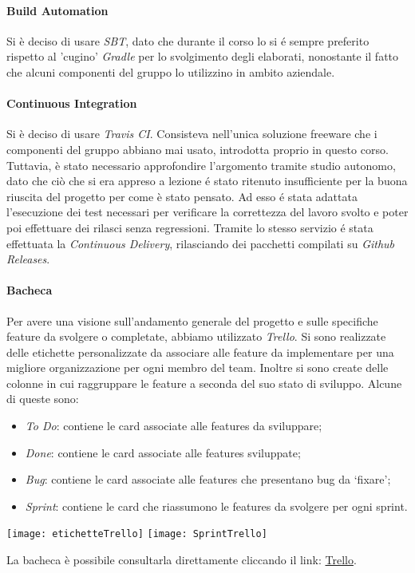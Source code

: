 \paragraph{Build Automation}
Si è deciso di usare \textit{SBT}, dato che durante il corso lo si é sempre preferito rispetto al 'cugino' \textit{Gradle} per lo svolgimento degli elaborati, nonostante il fatto che alcuni componenti del gruppo lo utilizzino in ambito aziendale.

\paragraph{Continuous Integration}
Si è deciso di usare \textit{Travis CI}.
Consisteva nell'unica soluzione freeware che i componenti del gruppo abbiano mai usato, introdotta proprio in questo corso.
Tuttavia, è stato necessario approfondire l'argomento tramite studio autonomo, dato che ciò che si era appreso a lezione é stato ritenuto insufficiente per la buona riuscita del progetto per come è stato pensato.
Ad esso é stata adattata l'esecuzione dei test necessari per verificare la correttezza del lavoro svolto e poter poi effettuare dei rilasci senza regressioni.
Tramite lo stesso servizio é stata effettuata la \textit{Continuous Delivery}, rilasciando dei pacchetti compilati su \textit{Github Releases}.

\paragraph{Bacheca}
Per avere una visione sull’andamento generale del progetto e sulle specifiche feature da svolgere o completate, abbiamo utilizzato \textit{Trello}.
\newline
Si sono realizzate delle etichette personalizzate da associare alle feature da implementare per una migliore organizzazione per ogni membro del team.
Inoltre si sono create delle colonne in cui raggruppare le feature a seconda del suo stato di sviluppo.
Alcune di queste sono:
\begin{itemize}
    \item \textit{To Do}: contiene le card associate alle features da sviluppare;
    \item \textit{Done}: contiene le card associate alle features sviluppate;
    \item \textit{Bug}: contiene le card associate alle features che presentano bug da ‘fixare’;
    \item \textit{Sprint}: contiene le card che riassumono le features da svolgere per ogni sprint.
\end{itemize}
\begin{center}
    \texttt{[image: etichetteTrello]}
    \texttt{[image: SprintTrello]}
\end{center}
La bacheca è possibile consultarla direttamente cliccando il link: \href{https://trello.com/b/Nk4j3Kuf/pps}{Trello}.

